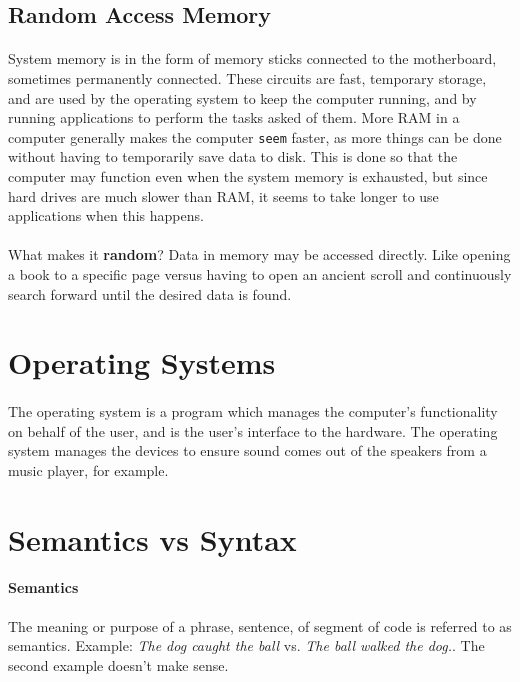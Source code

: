 \documentclass[letter,10pt]{article}
\begin{document}
\subsection{Random Access Memory}\label{sec:ram}
\paragraph{}System memory is in the form of memory sticks connected to the motherboard, sometimes permanently connected. These circuits are fast, temporary storage, and are used by the operating system to keep the computer running, and by running applications to perform the tasks asked of them. More RAM in a computer generally makes the computer \texttt{seem} faster, as more things can be done without having to temporarily save data to disk. This is done so that the computer may function even when the system memory is exhausted, but since hard drives are much slower than RAM, it seems to take longer to use applications when this happens.

\paragraph{}What makes it \textbf{random}? Data in memory may be accessed directly. Like opening a book to a specific page versus having to open an ancient scroll and continuously search forward until the desired data is found.

\section{Operating Systems}
\paragraph{}The operating system is a program which manages the computer's functionality on behalf of the user, and is the user's interface to the hardware. The operating system manages the devices to ensure sound comes out of the speakers from a music player, for example.

\section{Semantics vs Syntax}
\paragraph{Semantics} The meaning or purpose of a phrase, sentence, of segment of code is referred to as semantics. Example: \textit{The dog caught the ball} vs. \textit{The ball walked the dog.}. The second example doesn't make sense.
\end{document}
